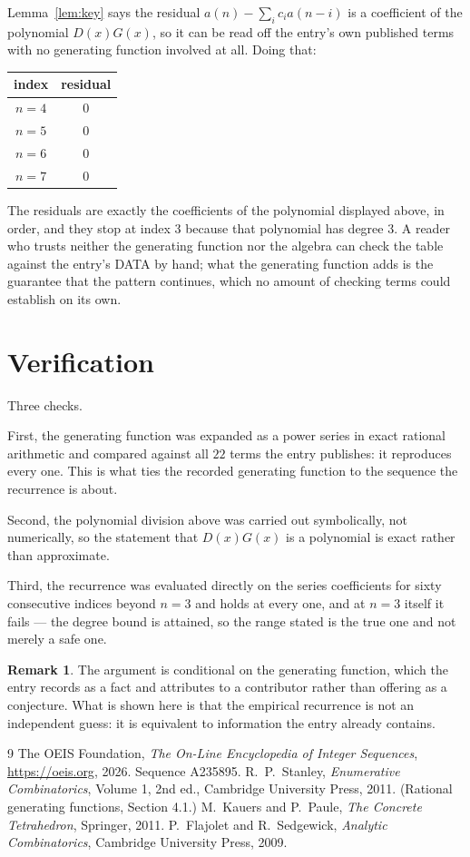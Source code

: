 \documentclass[11pt,a4paper]{article}
\theoremstyle{plain}
\theoremstyle{definition}
\newtheorem{remark}[theorem]{Remark}
\begin{document}
Lemma~\ref{lem:key} says the residual $a(n)-\sum_ic_ia(n-i)$ is a coefficient of the
polynomial $D(x)G(x)$, so it can be read off the entry's own published terms with no
generating function involved at all. Doing that:
\begin{center}
\begin{tabular}{cc}
index & residual \\ \hline
$n=4$ & $0$ \\
$n=5$ & $0$ \\
$n=6$ & $0$ \\
$n=7$ & $0$
\end{tabular}
\end{center}
The residuals are exactly the coefficients of the polynomial displayed above, in order, and
they stop at index $3$ because that polynomial has degree $3$. A reader who trusts
neither the generating function nor the algebra can check the table against the entry's DATA
by hand; what the generating function adds is the guarantee that the pattern continues, which
no amount of checking terms could establish on its own.

\section{Verification}

Three checks.

First, the generating function was expanded as a power series in exact rational arithmetic and
compared against all $22$ terms the entry publishes: it reproduces every one. This is
what ties the recorded generating function to the sequence the recurrence is about.

Second, the polynomial division above was carried out symbolically, not numerically, so the
statement that $D(x)G(x)$ is a polynomial is exact rather than approximate.

Third, the recurrence was evaluated directly on the series coefficients for sixty consecutive
indices beyond $n=3$ and holds at every one, and at $n=3$ itself it fails --- the
degree bound is attained, so the range stated is the true one and not merely a safe one.

\begin{remark}
The argument is conditional on the generating function, which the entry records as a fact and
attributes to a contributor rather than offering as a conjecture. What is shown here is that
the empirical recurrence is not an independent guess: it is equivalent to information the
entry already contains.
\end{remark}

\begin{thebibliography}{9}
 The OEIS Foundation, \emph{The On-Line Encyclopedia of Integer
Sequences}, \url{https://oeis.org}, 2026. Sequence A235895.
 R.~P.~Stanley, \emph{Enumerative Combinatorics}, Volume 1, 2nd ed.,
Cambridge University Press, 2011. (Rational generating functions, Section 4.1.)
 M.~Kauers and P.~Paule, \emph{The Concrete Tetrahedron}, Springer, 2011.
 P.~Flajolet and R.~Sedgewick, \emph{Analytic Combinatorics}, Cambridge
University Press, 2009.
\end{thebibliography}
\end{document}
